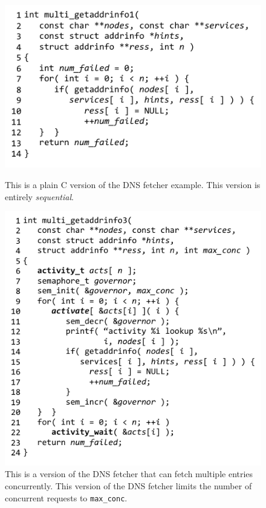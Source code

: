 \documentclass[acmsmall,anonymous,review]{acmart}\settopmatter{printfolios=true,printccs=false,printacmref=false}
\begin{document}
\begin{figure}
    \centering
    \begin{minipage}[t]{0.47\textwidth}
        \centering
        \includegraphics[width=1.0\textwidth]{Code/multi_getaddrinfo_seq}
        \caption{This is a plain C version of the DNS fetcher example.
  This version is entirely \emph{sequential}.}
        \label{fig:charcoal_multidns_seq}
    \end{minipage}\hfill
    \begin{minipage}[t]{0.47\textwidth}
        \centering
        \includegraphics[width=1.0\textwidth]{Code/multi_getaddrinfo_sem}
        \caption{This is a \charcoal{} version of the DNS fetcher that can fetch multiple entries concurrently.
          This version of the DNS fetcher limits the number of concurrent requests to \texttt{max\_conc}.}
        \label{fig:charcoal_multidns_sem}
    \end{minipage}
\end{figure}
\end{document}

